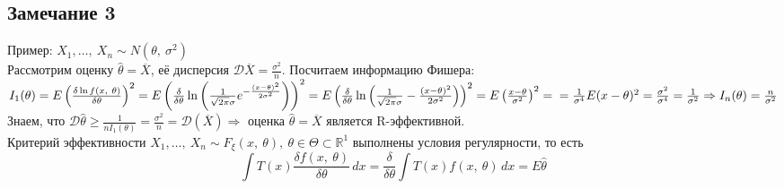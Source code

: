 \documentclass[12pt, a4paper]{article}
\begin{document}
\subsection*{Замечание 3}
Пример: $X_1,\dots,\ X_n \sim N(\theta,\ \sigma^2)$\\
Рассмотрим оценку $\hat{\theta} = \overline{X}$, её дисперсия $\mathcal{D}\overline{X} = \frac{\sigma^2}{n}$. Посчитаем информацию Фишера:\\
$I_1(\theta) = E\left( \frac{\delta \ln f(x,\ \theta)}{\delta \theta} \right)^2 = E\left( \frac{\delta}{\delta \theta} \ln\left( \frac{1}{\sqrt{2\pi}\sigma} e^{-\frac{(x - \theta)^2}{2\sigma^2}}\right) \right)^2 = E\left( \frac{\delta}{\delta \theta} \ln\left( \frac{1}{\sqrt{2\pi} \sigma} - \frac{(x - \theta)^2}{2\sigma^2} \right) \right)^2 = E\left( \frac{x - \theta}{\sigma^2} \right)^2 = \\
=\frac{1}{\sigma^4} E(x - \theta)^2 = \frac{\sigma^2}{\sigma^4} = \frac{1}{\sigma^2}\Rightarrow I_n(\theta) = \frac{n}{\sigma^2}$\\
Знаем, что $\mathcal{D}\hat{\theta} \geq \frac{1}{nI_1(\theta)} = \frac{\sigma^2}{n} = \mathcal{D}(\overline{X})\Rightarrow$ оценка $\hat{\theta} = \overline{X}$ является R-эффективной.\\
Критерий эффективности $X_1,\dots,\ X_n \sim F_{\xi}(x,\ \theta),\ \theta \in \Theta \subset \mathbb{R}^1$ выполнены условия регулярности, то есть
\[ \int T(x)\frac{\delta f(x,\ \theta)}{\delta \theta}\, dx = \frac{\delta}{\delta \theta} \int T(x) f(x,\ \theta)\, dx = E\hat{\theta}\]
\end{document}
